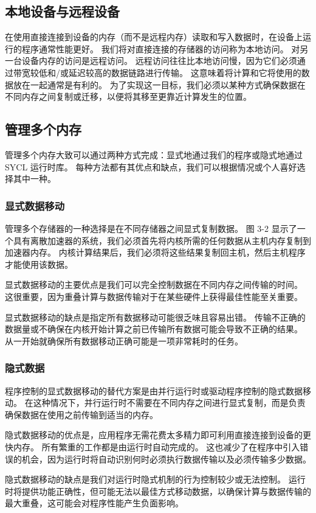 \subsection{本地设备与远程设备}
在使用直接连接到设备的内存（而不是远程内存）读取和写入数据时，在设备上运行的程序通常性能更好。 我们将对直接连接的存储器的访问称为本地访问。 对另一台设备内存的访问是远程访问。 远程访问往往比本地访问慢，因为它们必须通过带宽较低和/或延迟较高的数据链路进行传输。 这意味着将计算和它将使用的数据放在一起通常是有利的。 为了实现这一目标，我们必须以某种方式确保数据在不同内存之间复制或迁移，以便将其移至更靠近计算发生的位置。

\subsection{管理多个内存}
管理多个内存大致可以通过两种方式完成：显式地通过我们的程序或隐式地通过 SYCL 运行时库。 每种方法都有其优点和缺点，我们可以根据情况或个人喜好选择其中一种。

\subsubsection{显式数据移动}
管理多个存储器的一种选择是在不同存储器之间显式复制数据。 图 3-2 显示了一个具有离散加速器的系统，我们必须首先将内核所需的任何数据从主机内存复制到加速器内存。 内核计算结果后，我们必须将这些结果复制回主机，然后主机程序才能使用该数据。

显式数据移动的主要优点是我们可以完全控制数据在不同内存之间传输的时间。 这很重要，因为重叠计算与数据传输对于在某些硬件上获得最佳性能至关重要。

显式数据移动的缺点是指定所有数据移动可能很乏味且容易出错。 传输不正确的数据量或不确保在内核开始计算之前已传输所有数据可能会导致不正确的结果。 从一开始就确保所有数据移动正确可能是一项非常耗时的任务。

\subsubsection{隐式数据}
程序控制的显式数据移动的替代方案是由并行运行时或驱动程序控制的隐式数据移动。 在这种情况下，并行运行时不需要在不同内存之间进行显式复制，而是负责确保数据在使用之前传输到适当的内存。

隐式数据移动的优点是，应用程序无需花费太多精力即可利用直接连接到设备的更快内存。 所有繁重的工作都是由运行时自动完成的。 这也减少了在程序中引入错误的机会，因为运行时将自动识别何时必须执行数据传输以及必须传输多少数据。

隐式数据移动的缺点是我们对运行时隐式机制的行为控制较少或无法控制。 运行时将提供功能正确性，但可能无法以最佳方式移动数据，以确保计算与数据传输的最大重叠，这可能会对程序性能产生负面影响。

